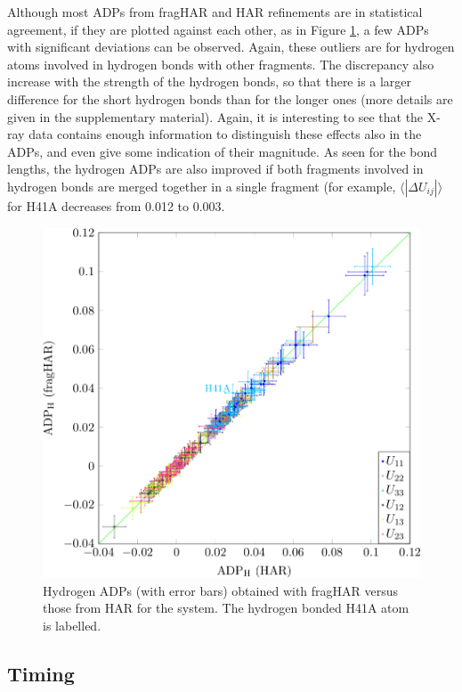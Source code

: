 \documentclass[preprint,dvipsnames]{iucr}              %
\newcommand{\justin}[1]{\textcolor{green}{#1}}
\begin{document}
Although most ADPs from fragHAR and HAR refinements are in statistical agreement,
if they are plotted against each other, as in Figure \ref{fig_ADP_H}, 
a few ADPs with significant deviations can be observed.
 Again, these outliers are for hydrogen atoms involved in hydrogen bonds with other fragments.
The discrepancy also increase with the strength of the  
hydrogen bonds, so that there is a larger difference for the short hydrogen bonds than for the longer ones
(more details are given in the supplementary material). Again, it is 
interesting to see that the X-ray data contains enough information 
to distinguish these effects also in the ADPs, and even give some 
indication of their magnitude.
As seen for the bond lengths, the hydrogen ADPs are also improved if both fragments involved in hydrogen bonds are merged together in a single fragment (for example, $\langle | \Delta U_{ij}| \rangle$ for H41A decreases from 0.012  to 0.003.


\begin{figure}
 \centering
 \includegraphics[width=0.8\linewidth]{graph_ADP.png}
	\caption{Hydrogen ADPs (with error bars) obtained with fragHAR 
	versus those from HAR for the  system. The hydrogen bonded
	H41A atom is labelled.}
	\label{fig_ADP_H}
\end{figure}







\subsection{Timing}
		
\end{document}
